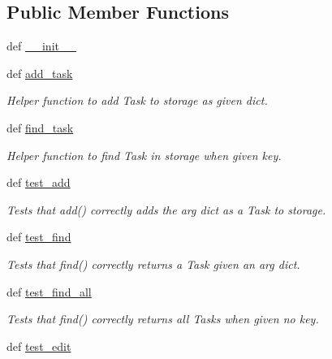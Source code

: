 \subsection*{\-Public \-Member \-Functions}
\begin{DoxyCompactItemize}
\item 
def \hyperlink{classtest__taskcontroller_1_1TestTaskController_a2ec547bb413edbb40c0ae582dd2466bd}{\-\_\-\-\_\-init\-\_\-\-\_\-}
\item 
def \hyperlink{classtest__taskcontroller_1_1TestTaskController_a89989d1173db14268c0329ad98d304d5}{add\-\_\-task}
\begin{DoxyCompactList}\small\item\em \-Helper function to add \-Task to storage as given dict. \end{DoxyCompactList}\item 
def \hyperlink{classtest__taskcontroller_1_1TestTaskController_a37d53351ab2b48968965ef22ad6c4a18}{find\-\_\-task}
\begin{DoxyCompactList}\small\item\em \-Helper function to find \-Task in storage when given key. \end{DoxyCompactList}\item 
def \hyperlink{classtest__taskcontroller_1_1TestTaskController_a9f241994236f76865549287f630b43ef}{test\-\_\-add}
\begin{DoxyCompactList}\small\item\em \-Tests that add() correctly adds the arg dict as a \-Task to storage. \end{DoxyCompactList}\item 
def \hyperlink{classtest__taskcontroller_1_1TestTaskController_a8921a89235720f678cef5ee895e34cee}{test\-\_\-find}
\begin{DoxyCompactList}\small\item\em \-Tests that find() correctly returns a \-Task given an arg dict. \end{DoxyCompactList}\item 
def \hyperlink{classtest__taskcontroller_1_1TestTaskController_ac5577377f866469b155257d7c2674b8c}{test\-\_\-find\-\_\-all}
\begin{DoxyCompactList}\small\item\em \-Tests that find() correctly returns all \-Tasks when given no key. \end{DoxyCompactList}\item 
def \hyperlink{classtest__taskcontroller_1_1TestTaskController_afc1f00967a02557cf405a3428d6d86b2}{test\-\_\-edit}

\end{DoxyCompactItemize}
